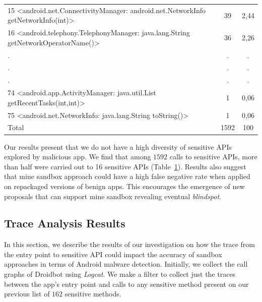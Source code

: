 \begin{table}[t]
\begin{small}
\begin{tabular}{lcc}
   15 <android.net.ConnectivityManager: android.net.NetworkInfo getNetworkInfo(int)> &  39 & 2,44 \\
   16 <android.telephony.TelephonyManager: java.lang.String getNetworkOperatorName()> &  36 & 2,26 \\
   .&  . & . \\
   .&  . & . \\
   .&  . & . \\
   74 <android.app.ActivityManager: java.util.List getRecentTasks(int,int)> & 1 & 0,06 \\
   75 <android.net.NetworkInfo: java.lang.String toString()> & 1 & 0,06 \\

 \bottomrule
                            Total & 1592 & 100 \\

 \end{tabular}
 \end{small}
 \label{tab:APIused}
\end{table}

\begin{obs}{1}{}
   Our results present that we do not have a high diversity of sensitive APIs explored by malicious app. We find that among $1592$ calls to sensitive APIs, more than half were carried out to 16 sensitive APIs (Table~\ref{tab:APIused}). Results also suggest that mine sandbox approach could have a high false negative rate when applied on repackaged versions of benign apps. This encourages the emergence of new proposals that can support mine sandbox revealing eventual \textit{blindspot}.
 \end{obs}



\subsection{Trace Analysis Results}\label{sec:traceResults}

In this section, we describe the results of our investigation on how the trace from the entry point to sensitive API could impact the accuracy of sandbox approaches in terms of Android malware detection. Initially, we collect the call graphs of Droidbot using \emph{Logcat}. We make a filter to collect just the traces between the app's entry point and calls to any sensitive method present on our previous list of $162$ sensitive methods.

